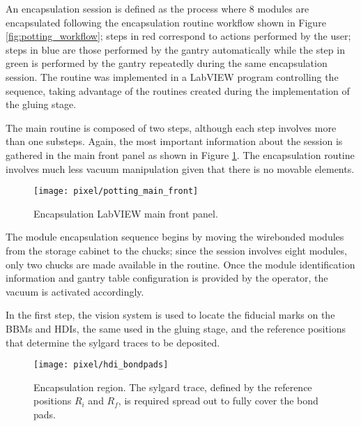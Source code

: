An encapsulation session is defined as the process where 8 modules are encapsulated following the encapsulation routine workflow shown in Figure \ref{fig:potting_workflow}; steps in red correspond to actions performed by the user; steps in blue are those performed by the gantry automatically while the step in green is performed by the gantry repeatedly during the same encapsulation session. The routine was implemented in a LabVIEW program controlling the sequence, taking advantage of the routines created during the implementation of the gluing stage.   

The main routine is composed of two steps, although each step involves more than one substeps. Again, the most important information about the session is gathered in the main front panel as shown in Figure \ref{fig:potting_main_front}. The encapsulation routine involves much less vacuum manipulation given that there is no movable elements.

\begin{landscape}
\begin{figure}[h]
\begin{center}
    \vspace{-2.9cm}
    \hspace{-1cm}
    \texttt{[image: pixel/potting\_main\_front]}
    \caption[Encapsulation LabVIEW main front panel]{Encapsulation LabVIEW main front panel.}\label{fig:potting_main_front}
    \vspace{-2cm}
    \hspace{-2cm}
\end{center}
\end{figure}
\end{landscape}

The module encapsulation sequence begins by moving the wirebonded modules from the storage cabinet to the chucks; since the session involves eight modules, only two chucks are made available in the routine. Once the module identification information and gantry table configuration is provided by the operator, the vacuum is activated accordingly.

In the first step, the vision system is used to locate the fiducial marks on the BBMs and HDIs, the same used in the gluing stage, and the reference positions that determine the sylgard traces to be deposited. 

\begin{figure}[h]
\begin{center}
  \texttt{[image: pixel/hdi\_bondpads]}
 \caption[Encapsulation region.]{Encapsulation region. The sylgard trace, defined by the reference positions $R_i$ and $R_f$, is required spread out to fully cover the bond pads. }\label{fig:hdi_bondpads}
\end{center}
\end{figure}

